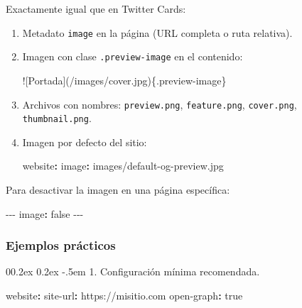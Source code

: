\documentclass[
  doc,
  floatsintext,
  longtable,
  a4paper,
  nolmodern,
  notxfonts,
  notimes,
  12pt,
  colorlinks=true,linkcolor=blue,citecolor=blue,urlcolor=blue]{apa7}
\makeatletter
\renewcommand{\paragraph}{\@startsection{paragraph}{4}{\parindent}%
	{0\baselineskip \@plus 0.2ex \@minus 0.2ex}%
	{-.5em}%
	{\normalfont\normalsize\bfseries\typesectitle}}
\newenvironment{Shaded}{\begin{snugshade}}{\end{snugshade}}
\newcommand{\AlertTok}[1]{\textcolor[rgb]{0.68,0.00,0.00}{#1}}
\newcommand{\AttributeTok}[1]{\textcolor[rgb]{0.40,0.45,0.13}{#1}}
\newcommand{\CharTok}[1]{\textcolor[rgb]{0.13,0.47,0.30}{#1}}
\newcommand{\FunctionTok}[1]{\textcolor[rgb]{0.28,0.35,0.67}{#1}}
\newcommand{\KeywordTok}[1]{\textcolor[rgb]{0.00,0.23,0.31}{\textbf{#1}}}
\newcommand{\NormalTok}[1]{\textcolor[rgb]{0.00,0.23,0.31}{#1}}
\newcommand{\PreprocessorTok}[1]{\textcolor[rgb]{0.68,0.00,0.00}{#1}}
\makeatother
\begin{document}
Exactamente igual que en Twitter Cards:

\begin{enumerate}
\def\labelenumi{\arabic{enumi}.}
\item
  Metadato \texttt{image} en la página (URL completa o ruta relativa).
\item
  Imagen con clase \texttt{.preview-image} en el contenido:

\begin{Shaded}
\begin{Highlighting}[]
\AlertTok{![Portada](/images/cover.jpg)}\NormalTok{\{.preview{-}image\}}
\end{Highlighting}
\end{Shaded}
\item
  Archivos con nombres: \texttt{preview.png}, \texttt{feature.png},
  \texttt{cover.png}, \texttt{thumbnail.png}.
\item
  Imagen por defecto del sitio:

\begin{Shaded}
\begin{Highlighting}[]
\FunctionTok{website}\KeywordTok{:}
\AttributeTok{  }\FunctionTok{image}\KeywordTok{:}\AttributeTok{ images/default{-}og{-}preview.jpg}
\end{Highlighting}
\end{Shaded}
\end{enumerate}

Para desactivar la imagen en una página específica:

\begin{Shaded}
\begin{Highlighting}[]
\PreprocessorTok{{-}{-}{-}}
\FunctionTok{image}\KeywordTok{:}\AttributeTok{ }\CharTok{false}
\PreprocessorTok{{-}{-}{-}}
\end{Highlighting}
\end{Shaded}

\subsubsection{Ejemplos prácticos}\label{ejemplos-pruxe1cticos-1}

\paragraph{1. Configuración mínima
recomendada.}\label{configuraciuxf3n-muxednima-recomendada}

\begin{Shaded}
\begin{Highlighting}[]
\FunctionTok{website}\KeywordTok{:}
\AttributeTok{  }\FunctionTok{site{-}url}\KeywordTok{:}\AttributeTok{ https://misitio.com}
\AttributeTok{  }\FunctionTok{open{-}graph}\KeywordTok{:}\AttributeTok{ }\CharTok{true}
\end{Highlighting}
\end{Shaded}
\end{document}
